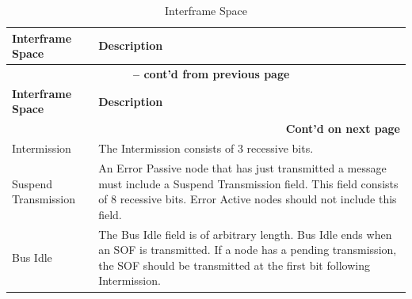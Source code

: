\begin{longtable}[c]{|p{4cm}|p{11cm}|} 
  \caption{Interframe Space}
  \label{tab:twai-interframe-space} 
  \\\hline
  \rowcolor{lightgray}
  \textbf{Interframe Space} & \textbf{Description}
  \\\hline
  \endfirsthead
  
  \multicolumn{2}{c}{\bfseries \tablename\ \thetable{} -- cont'd from previous page}\\  \hline
  
  \rowcolor{lightgray}
    \textbf{Interframe Space} & \textbf{Description}
  \\\hline
  \endhead
  
  \multicolumn{2}{r}{\textbf{Cont'd on next page}} \\
  \endfoot
  \endlastfoot
  
    Intermission & The Intermission consists of 3 recessive bits.
           \\\hline
    Suspend Transmission & An Error Passive node that has just transmitted a message must include a Suspend Transmission field. This field consists of 8 recessive bits. Error Active nodes should not include this field.
            \\\hline
    Bus Idle & The Bus Idle field is of arbitrary length. Bus Idle ends when an SOF is transmitted. If a node has a pending transmission, the SOF should be transmitted at the first bit following Intermission.         
            \\\hline
    
\end{longtable}

